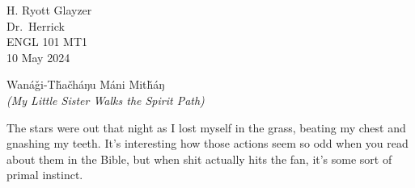 \documentclass[12pt, letterpaper]{article}
\begin{document}
\begin{flushleft}

H. Ryott Glayzer\\
Dr.\ Herrick\\
ENGL 101 MT1\\
10 May 2024\\


\begin{center}
	\large Wanáǧi-Tȟačháŋu Máni Mitȟáŋ\\ 
	\scriptsize \textit{(My Little Sister Walks the Spirit Path)}
\end{center}


\setlength{\parindent}{0.5in}




The stars were out that night as I lost myself in the grass, beating my chest and gnashing my teeth.
It’s interesting how those actions seem so odd when you read about them in the Bible,
but when shit actually hits the fan, it’s some sort of primal instinct.
\vspace{5mm}




\end{flushleft}
\end{document}
